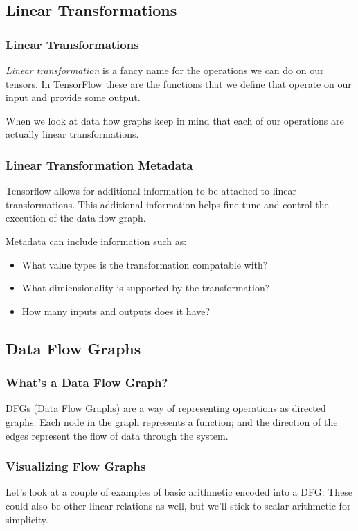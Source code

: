 \documentclass{beamer}
\begin{document}
\subsection{Linear Transformations}

\begin{frame}
  \frametitle{Linear Transformations}

  \emph{Linear transformation} is a fancy name for the operations we
  can do on our tensors.  In TensorFlow these are the functions that
  we define that operate on our input and provide some output.

  When we look at data flow graphs keep in mind that each of our
  operations are actually linear transformations.
\end{frame}

\begin{frame}
  \frametitle{Linear Transformation Metadata}

  Tensorflow allows for additional information to be attached to
  linear transformations.  This additional information helps fine-tune
  and control the execution of the data flow graph.

  Metadata can include information such as:
  \begin{itemize}
    \item What value types is the transformation compatable with?
    \item What dimiensionality is supported by the transformation?
    \item How many inputs and outputs does it have?
  \end{itemize}
\end{frame}

\subsection{Data Flow Graphs}

\begin{frame}
  \frametitle{What's a Data Flow Graph?}

  DFGs (Data Flow Graphs) are a way of representing operations as
  directed graphs.  Each node in the graph represents a function; and
  the direction of the edges represent the flow of data through the
  system.
\end{frame}

\begin{frame}
  \frametitle{Visualizing Flow Graphs}

  Let's look at a couple of examples of basic arithmetic encoded into
  a DFG.  These could also be other linear relations as well, but
  we'll stick to scalar arithmetic for simplicity.
\end{frame}
\end{document}
